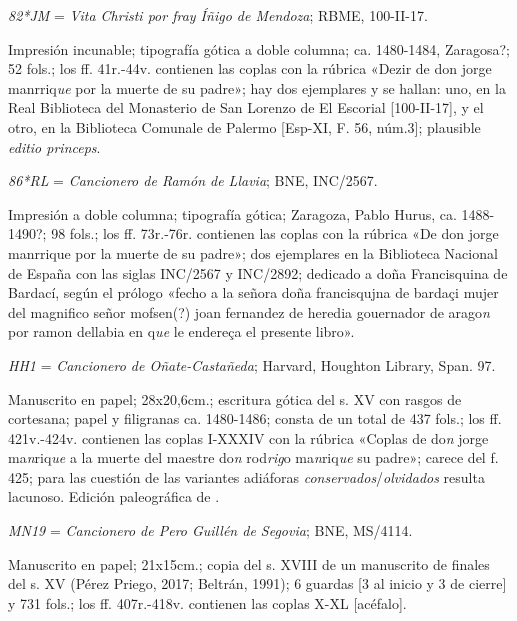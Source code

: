\documentclass[11pt,a4paper,twoside]{article}
\newcommand{\comillas}[1]{«#1»}
\begin{document}
\textit{82*JM} = \textit{Vita Christi por fray Íñigo de Mendoza}; RBME, 100-II-17.

Impresión incunable; tipografía gótica a doble columna; ca. 1480-1484, Zaragosa?; 52 fols.; los ff. 41r.-44v. contienen las coplas con la rúbrica \comillas{Dezir de don jorge manrriq\textit{ue} por la muerte de su padre}; hay dos ejemplares y se hallan: uno, en la Real Biblioteca del Monasterio de San Lorenzo de El Escorial [100-II-17], y el otro, en la Biblioteca Comunale de Palermo [Esp-XI, F. 56, núm.3]; plausible \textit{editio princeps}.\vspace{5pt}

\textit{86*RL} = \textit{Cancionero de Ramón de Llavia}; BNE, INC/2567.

Impresión a doble columna; tipografía gótica; Zaragoza, Pablo Hurus, ca. 1488-1490?; 98 fols.; los ff. 73r.-76r. contienen las coplas con la rúbrica \comillas{De don jorge manrrique por la muerte de su padre}; dos ejemplares en la Biblioteca Nacional de España con las siglas INC/2567 y INC/2892; dedicado a doña Francisquina de Bardací, según el prólogo \comillas{fecho a la señora doña francisqujna de bardaçi mujer del magnifico señor mofsen(?) joan fernandez de heredia gouernador de arago\textit{n} por ramon dellabia en q\textit{ue} le endereça el presente libro}.\vspace{5pt}

\textit{HH1} = \textit{Cancionero de Oñate-Castañeda}; Harvard, Houghton Library, Span. 97.

Manuscrito en papel; 28x20,6cm.; escritura gótica del s. XV con rasgos de cortesana; papel y filigranas ca. 1480-1486; consta de un total de 437 fols.; los ff. 421v.-424v. contienen las coplas I-XXXIV con la rúbrica \comillas{Coplas de do\textit{n} jorge ma\textit{n}riq\textit{ue} a la muerte del maestre do\textit{n} rod\textit{rig}o ma\textit{n}riq\textit{ue} su padre}; carece del f. 425; para las cuestión de las variantes adiáforas \textit{conservados}/\textit{olvidados} resulta lacunoso. Edición paleográfica de \textcite{Severin1990}.\vspace{5pt} 

\textit{MN19} = \textit{Cancionero de Pero Guillén de Segovia}; BNE, MS/4114.

Manuscrito en papel; 21x15cm.; copia del s. XVIII de un manuscrito de finales del s. XV (Pérez Priego, 2017; Beltrán, 1991); 6 guardas [3 al inicio y 3 de cierre] y 731 fols.; los ff. 407r.-418v. contienen las coplas X-XL [acéfalo].\vspace{5pt}
\end{document}
